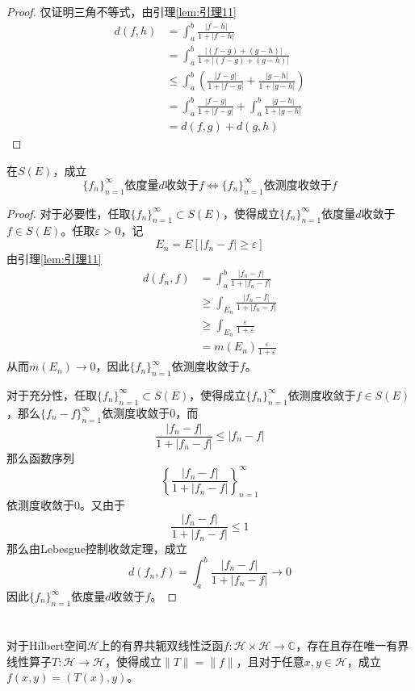 \documentclass[lang = cn, scheme = chinese]{elegantbook}
\newcommand{\C}{\mathbb{C}}  		   %
\newcommand{\sub}{\subset}             %
\begin{document}
\begin{proof}
	仅证明三角不等式，由引理\ref{lem:引理11}
	\begin{align*}
		d(f,h)
		& = \int_a^b\frac{|f-h|}{1+|f-h|}\\
		& = \int_a^b\frac{|(f-g)+(g-h)|}{1+|(f-g)+(g-h)|}\\
		& \le \int_a^b \left( \frac{|f-g|}{1+|f-g|}+\frac{|g-h|}{1+|g-h|} \right)\\
		& = \int_a^b\frac{|f-g|}{1+|f-g|}+\int_a^b\frac{|g-h|}{1+|g-h|}\\
		& = d(f,g)+d(g,h)
	\end{align*}
\end{proof}

\begin{proposition}
	在$S(E)$，成立
	$$
	\{f_n\}_{n=1}^{\infty}\text{依度量}d\text{收敛于}f\iff \{f_n\}_{n=1}^{\infty}\text{依测度收敛于}f
	$$
\end{proposition}

\begin{proof}
	对于必要性，任取$\{f_n\}_{n=1}^{\infty}\sub S(E)$，使得成立$\{f_n\}_{n=1}^{\infty}$依度量$d$收敛于$f\in S(E)$。任取$\varepsilon>0$，记
	$$
	E_n=E[|f_n-f|\ge \varepsilon]
	$$
	由引理\ref{lem:引理11}
	\begin{align*}
		d(f_n,f)
		& = \int_a^b\frac{|f_n-f|}{1+|f_n-f|}\\
		& \ge \int_{E_n}\frac{|f_n-f|}{1+|f_n-f|}\\
		& \ge \int_{E_n}\frac{\varepsilon}{1+\varepsilon}\\
		& = m(E_n)\frac{\varepsilon}{1+\varepsilon}
	\end{align*}
	从而$m(E_n)\to 0$，因此$\{f_n\}_{n=1}^{\infty}$依测度收敛于$f$。
	
	对于充分性，任取$\{f_n\}_{n=1}^{\infty}\sub S(E)$，使得成立$\{f_n\}_{n=1}^{\infty}$依测度收敛于$f\in S(E)$，那么$\{ f_n-f \}_{n=1}^{\infty}$依测度收敛于$0$，而
	$$
	\frac{|f_n-f|}{1+|f_n-f|}\le |f_n-f|
	$$
	那么函数序列
	$$
	\left\{ \frac{|f_n-f|}{1+|f_n-f|}\right\}_{n=1}^{\infty}
	$$
	依测度收敛于$0$。又由于
	$$
	\frac{|f_n-f|}{1+|f_n-f|}\le 1
	$$
	那么由Lebesgue控制收敛定理，成立
	$$
	d(f_n,f)=\int_a^b\frac{|f_n-f|}{1+|f_n-f|}\to0
	$$
	因此$\{f_n\}_{n=1}^{\infty}$依度量$d$收敛于$f$。
\end{proof}

\chapter{}

\begin{proposition}
	对于Hilbert空间$\mathcal{H}$上的有界共轭双线性泛函$f:\mathcal{H}\times \mathcal{H}\to\C$，存在且存在唯一有界线性算子$T:\mathcal{H}\to\mathcal{H}$，使得成立$\|T\|=\|f\|$，且对于任意$x,y\in \mathcal{H}$，成立$f(x,y)=(T(x),y)$。
\end{proposition}
\end{document}
